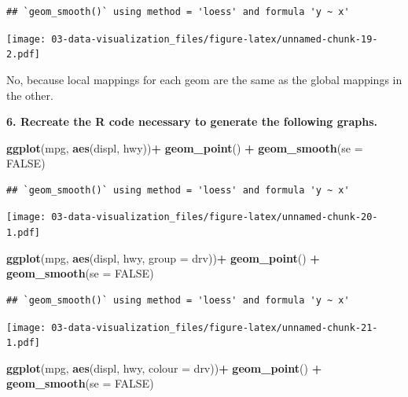 \documentclass[]{book}
\newenvironment{Shaded}{\begin{snugshade}}{\end{snugshade}}
\newcommand{\DataTypeTok}[1]{\textcolor[rgb]{0.13,0.29,0.53}{#1}}
\newcommand{\KeywordTok}[1]{\textcolor[rgb]{0.13,0.29,0.53}{\textbf{#1}}}
\newcommand{\NormalTok}[1]{#1}
\newcommand{\OperatorTok}[1]{\textcolor[rgb]{0.81,0.36,0.00}{\textbf{#1}}}
\newcommand{\OtherTok}[1]{\textcolor[rgb]{0.56,0.35,0.01}{#1}}
\newcommand{\StringTok}[1]{\textcolor[rgb]{0.31,0.60,0.02}{#1}}
\theoremstyle{definition}
\theoremstyle{definition}
\theoremstyle{definition}
\theoremstyle{remark}
\begin{document}
\begin{verbatim}
## `geom_smooth()` using method = 'loess' and formula 'y ~ x'
\end{verbatim}

\texttt{[image: 03-data-visualization\_files/figure-latex/unnamed-chunk-19-2.pdf]}

No, because local mappings for each geom are the same as the global
mappings in the other.

\textbf{6. Recreate the R code necessary to generate the following
graphs.}

\begin{Shaded}
\begin{Highlighting}[]
\KeywordTok{ggplot}\NormalTok{(mpg, }\KeywordTok{aes}\NormalTok{(displ, hwy))}\OperatorTok{+}
\StringTok{  }\KeywordTok{geom_point}\NormalTok{() }\OperatorTok{+}
\StringTok{  }\KeywordTok{geom_smooth}\NormalTok{(}\DataTypeTok{se =} \OtherTok{FALSE}\NormalTok{)}
\end{Highlighting}
\end{Shaded}

\begin{verbatim}
## `geom_smooth()` using method = 'loess' and formula 'y ~ x'
\end{verbatim}

\texttt{[image: 03-data-visualization\_files/figure-latex/unnamed-chunk-20-1.pdf]}

\begin{Shaded}
\begin{Highlighting}[]
\KeywordTok{ggplot}\NormalTok{(mpg, }\KeywordTok{aes}\NormalTok{(displ, hwy, }\DataTypeTok{group =}\NormalTok{ drv))}\OperatorTok{+}
\StringTok{  }\KeywordTok{geom_point}\NormalTok{() }\OperatorTok{+}
\StringTok{  }\KeywordTok{geom_smooth}\NormalTok{(}\DataTypeTok{se =} \OtherTok{FALSE}\NormalTok{)}
\end{Highlighting}
\end{Shaded}

\begin{verbatim}
## `geom_smooth()` using method = 'loess' and formula 'y ~ x'
\end{verbatim}

\texttt{[image: 03-data-visualization\_files/figure-latex/unnamed-chunk-21-1.pdf]}

\begin{Shaded}
\begin{Highlighting}[]
\KeywordTok{ggplot}\NormalTok{(mpg, }\KeywordTok{aes}\NormalTok{(displ, hwy, }\DataTypeTok{colour =}\NormalTok{ drv))}\OperatorTok{+}
\StringTok{  }\KeywordTok{geom_point}\NormalTok{() }\OperatorTok{+}
\StringTok{  }\KeywordTok{geom_smooth}\NormalTok{(}\DataTypeTok{se =} \OtherTok{FALSE}\NormalTok{)}
\end{Highlighting}
\end{Shaded}
\end{document}
